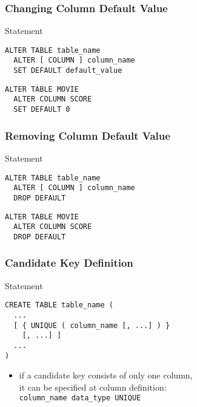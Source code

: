 \documentclass[dvipsnames]{beamer}
\theoremstyle{plain}
\begin{document}
\begin{frame}[fragile]
  \frametitle{Changing Column Default Value}

  \begin{block}{Statement}
    \begin{lstlisting}
ALTER TABLE table_name
  ALTER [ COLUMN ] column_name
  SET DEFAULT default_value
    \end{lstlisting}
  \end{block}

  \pause
  \begin{example}
    \begin{lstlisting}
ALTER TABLE MOVIE
  ALTER COLUMN SCORE
  SET DEFAULT 0
    \end{lstlisting}
  \end{example}
\end{frame}

\begin{frame}[fragile]
  \frametitle{Removing Column Default Value}

  \begin{block}{Statement}
    \begin{lstlisting}
ALTER TABLE table_name
  ALTER [ COLUMN ] column_name
  DROP DEFAULT
    \end{lstlisting}
  \end{block}

  \pause
  \begin{example}
    \begin{lstlisting}
ALTER TABLE MOVIE
  ALTER COLUMN SCORE
  DROP DEFAULT
    \end{lstlisting}
  \end{example}
\end{frame}

\begin{frame}[fragile]
  \frametitle{Candidate Key Definition}

  \begin{block}{Statement}
    \begin{lstlisting}
CREATE TABLE table_name (
  ...
  [ { UNIQUE ( column_name [, ...] ) }
    [, ...] ]
  ...
)
    \end{lstlisting}
  \end{block}

  \begin{itemize}
    \item if a candidate key consists of only one column,\\
      it can be specified at column definition:\\
      \lstinline!column_name data_type UNIQUE!
  \end{itemize}
\end{frame}
\end{document}
